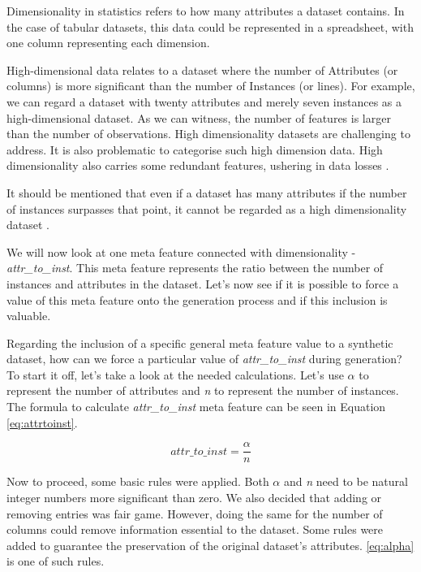 Dimensionality in statistics refers to how many attributes a dataset contains. In the case of tabular datasets, this data could be represented in a spreadsheet, with one column representing each dimension. 

High-dimensional data relates to a dataset where the number of Attributes (or columns) is more significant than the number of Instances (or lines). For example, we can regard a dataset with twenty attributes and merely seven instances as a high-dimensional dataset. As we can witness, the number of features is larger than the number of observations. High dimensionality datasets are challenging to address. It is also problematic to categorise such high dimension data. High dimensionality also carries some redundant features, ushering in data losses \citep{ray2021various}.

It should be mentioned that even if a dataset has many attributes if the number of instances surpasses that point, it cannot be regarded as a high dimensionality dataset \citep{ziegel2003elements}.

We will now look at one meta feature connected with dimensionality - \textit{attr\_to\_inst}. This meta feature represents the ratio between the number of instances and attributes in the dataset. Let's now see if it is possible to force a value of this meta feature onto the generation process and if this inclusion is valuable.

Regarding the inclusion of a specific general meta feature value to a synthetic dataset, how can we force a particular value of \textit{attr\_to\_inst} during generation? To start it off, let's take a look at the needed calculations. Let's use $\alpha$ to represent the number of attributes and \textit{n} to represent the number of instances. The formula to calculate \textit{attr\_to\_inst} meta feature can be seen in Equation \ref{eq:attrtoinst}.

\begin{equation}
  \label{eq:attrtoinst}
  attr\_to\_inst=\frac{\alpha}{n}
\end{equation}

Now to proceed, some basic rules were applied. Both $\alpha$ and \textit{n} need to be natural integer numbers more significant than zero. We also decided that adding or removing entries was fair game. However, doing the same for the number of columns could remove information essential to the dataset. Some rules were added to guarantee the preservation of the original dataset's attributes. \ref{eq:alpha} is one of such rules.

